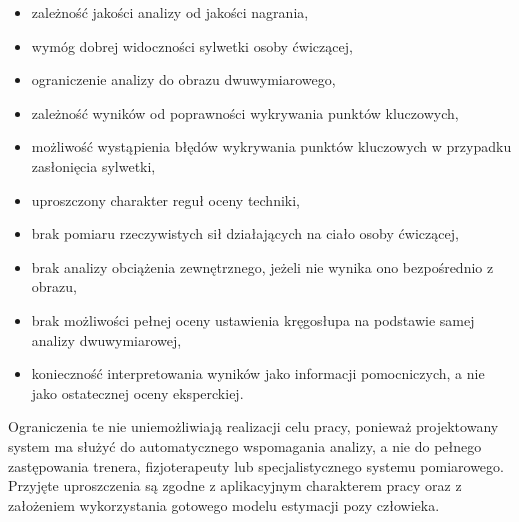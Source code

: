 \begin{itemize}
\item zależność jakości analizy od jakości nagrania,
\item wymóg dobrej widoczności sylwetki osoby ćwiczącej,
\item ograniczenie analizy do obrazu dwuwymiarowego,
\item zależność wyników od poprawności wykrywania punktów kluczowych,
\item możliwość wystąpienia błędów wykrywania punktów kluczowych w przypadku zasłonięcia sylwetki,
\item uproszczony charakter reguł oceny techniki,
\item brak pomiaru rzeczywistych sił działających na ciało osoby ćwiczącej,
\item brak analizy obciążenia zewnętrznego, jeżeli nie wynika ono bezpośrednio z obrazu,
\item brak możliwości pełnej oceny ustawienia kręgosłupa na podstawie samej analizy dwuwymiarowej,
\item konieczność interpretowania wyników jako informacji pomocniczych, a nie jako ostatecznej oceny eksperckiej.
\end{itemize}

Ograniczenia te nie uniemożliwiają realizacji celu pracy, ponieważ projektowany system ma służyć do automatycznego wspomagania analizy, a nie do pełnego zastępowania trenera, fizjoterapeuty lub specjalistycznego systemu pomiarowego. Przyjęte uproszczenia są zgodne z aplikacyjnym charakterem pracy oraz z założeniem wykorzystania gotowego modelu estymacji pozy człowieka.